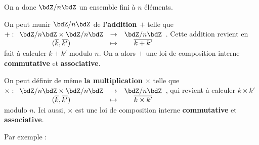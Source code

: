 \documentclass[a4paper,french,bookmarks]{article}
\begin{document}
\begin{enumerate}
    On a donc $\bdZ/n\bdZ$ un ensemble fini à $n$ éléments. 
    
    \begin{enumerate}
    
        \itstar On peut munir $\bdZ/n\bdZ$ de \textbf{l'addition $+$} telle que $+ : \begin{array}[t]{ccc}
            \bdZ/n\bdZ\times\bdZ/n\bdZ &\to& \bdZ/n\bdZ  \\
            (\overline{k}, \overline{k'}) &\mapsto& \overline{k+k'}
        \end{array}$. Cette addition revient en fait à calculer $k + k'$ modulo $n$. On a alors $+$ une loi de composition interne \textbf{commutative} et \textbf{associative}.
        
        \itstar On peut définir de même \textbf{la multiplication $\times$} telle que $\times : \begin{array}[t]{ccc}
            \bdZ/n\bdZ\times\bdZ/n\bdZ &\to& \bdZ/n\bdZ  \\
            (\overline{k}, \overline{k'}) &\mapsto& \overline{k\times k'}
        \end{array}$, qui revient à calculer $k\times k'$ modulo $n$. Ici aussi, $\times$ est une loi de composition interne \textbf{commutative} et \textbf{associative}.
        
        \itstar Par exemple :
        

\end{enumerate}
\end{enumerate}
\end{document}
